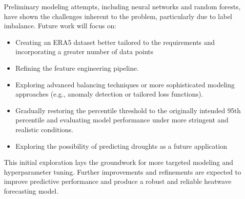 \documentclass[12pt,a4paper]{article}
\begin{document}
Preliminary modeling attempts, including neural networks and random forests, have shown the challenges inherent to the problem, particularly due to label imbalance. Future work will focus on:
\begin{itemize}
	\item Creating an ERA5 dataset better tailored to the requirements and incorporating a greater number of data points
    \item Refining the feature engineering pipeline.
    \item Exploring advanced balancing techniques or more sophisticated modeling approaches (e.g., anomaly detection or tailored loss functions).
    \item Gradually restoring the percentile threshold to the originally intended 95th percentile and evaluating model performance under more stringent and realistic conditions.
    \item Exploring the possibility of predicting droughts as a future application
\end{itemize}

This initial exploration lays the groundwork for more targeted modeling and hyperparameter tuning. Further improvements and refinements are expected to improve predictive performance and produce a robust and reliable heatwave forecasting model.
\end{document}
